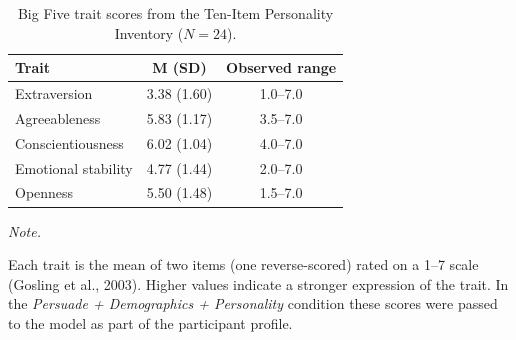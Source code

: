 \begin{table}[!h]
\centering
\caption{\label{tab:tipi}Big Five trait scores from the Ten-Item Personality Inventory ($N = 24$).}
\centering
\fontsize{10}{12}\selectfont
\begin{threeparttable}
\begin{tabular}[t]{lcc}
\toprule
Trait & M (SD) & Observed range\\
\midrule
Extraversion & 3.38 (1.60) & 1.0--7.0\\
Agreeableness & 5.83 (1.17) & 3.5--7.0\\
Conscientiousness & 6.02 (1.04) & 4.0--7.0\\
Emotional stability & 4.77 (1.44) & 2.0--7.0\\
Openness & 5.50 (1.48) & 1.5--7.0\\
\bottomrule
\end{tabular}
\begin{tablenotes}
\item \textit{Note.} 
\item Each trait is the mean of two items (one reverse-scored) rated on a 1--7 scale (Gosling et al., 2003). Higher values indicate a stronger expression of the trait. In the \emph{Persuade + Demographics + Personality} condition these scores were passed to the model as part of the participant profile.
\end{tablenotes}
\end{threeparttable}
\end{table}
